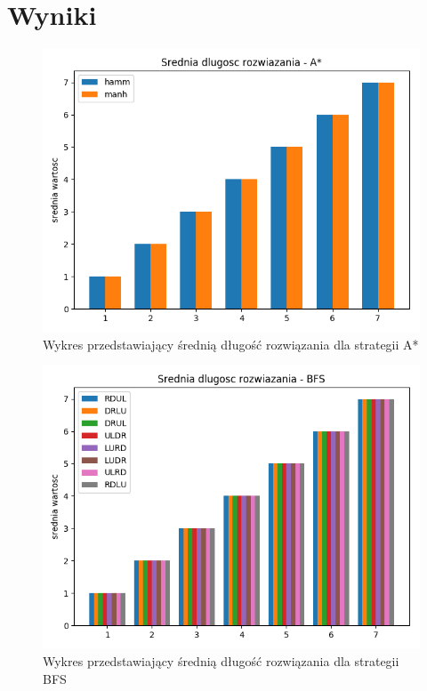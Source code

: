 \documentclass{classrep}
\begin{document}
\section{Wyniki}
{
\begin{figure}[h]
\centering
\includegraphics [scale=0.5]{dlugosc_AStar}
\caption{Wykres przedstawiający średnią długość rozwiązania dla strategii A*}
\end{figure}
\begin{figure}
\centering
\includegraphics [scale=0.5]{dlugosc_BFS}
\caption{Wykres przedstawiający średnią długość rozwiązania dla strategii BFS}
\end{figure}
\begin{figure}
\centering

\end{figure}}
\end{document}
